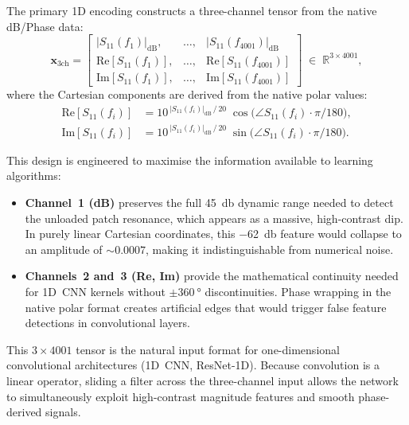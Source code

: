 The primary 1D encoding constructs a three-channel tensor from the
native dB/Phase data:
\begin{equation}
    \mathbf{x}_{\text{3ch}} =
    \begin{bmatrix}
        |S_{11}(f_1)|_{\text{dB}}, & \ldots, & |S_{11}(f_{4001})|_{\text{dB}} \\
        \text{Re}[S_{11}(f_1)],    & \ldots, & \text{Re}[S_{11}(f_{4001})] \\
        \text{Im}[S_{11}(f_1)],    & \ldots, & \text{Im}[S_{11}(f_{4001})]
    \end{bmatrix}
    \;\in\;\mathbb{R}^{3 \times 4001},
    \label{eq:three_channel}
\end{equation}
where the Cartesian components are derived from the native polar values:
\begin{align}
    \text{Re}[S_{11}(f_i)] &= 10^{\,|S_{11}(f_i)|_{\text{dB}}\,/\,20}
        \;\cos\!\bigl(\angle S_{11}(f_i) \cdot \pi/180\bigr),
        \label{eq:polar_to_re} \\
    \text{Im}[S_{11}(f_i)] &= 10^{\,|S_{11}(f_i)|_{\text{dB}}\,/\,20}
        \;\sin\!\bigl(\angle S_{11}(f_i) \cdot \pi/180\bigr).
        \label{eq:polar_to_im}
\end{align}

This design is engineered to maximise the information available to
learning algorithms:
\begin{itemize}
    \item \textbf{Channel~1 (dB)} preserves the full \SI{45}{\decibel}
        dynamic range needed to detect the unloaded patch resonance,
        which appears as a massive, high-contrast dip.  In purely linear
        Cartesian coordinates, this \SI{-62}{\decibel} feature would
        collapse to an amplitude of $\sim 0.0007$, making it
        indistinguishable from numerical noise.
    \item \textbf{Channels~2 and~3 (Re, Im)} provide the mathematical
        continuity needed for 1D~CNN kernels without
        $\pm\SI{360}{\degree}$ discontinuities.  Phase wrapping in the
        native polar format creates artificial edges that would trigger
        false feature detections in convolutional layers.
\end{itemize}

This $3 \times 4001$ tensor is the natural input format for
one-dimensional convolutional architectures (1D~CNN, ResNet-1D).
Because convolution is a linear operator, sliding a filter across the
three-channel input allows the network to simultaneously exploit
high-contrast magnitude features and smooth phase-derived signals.

